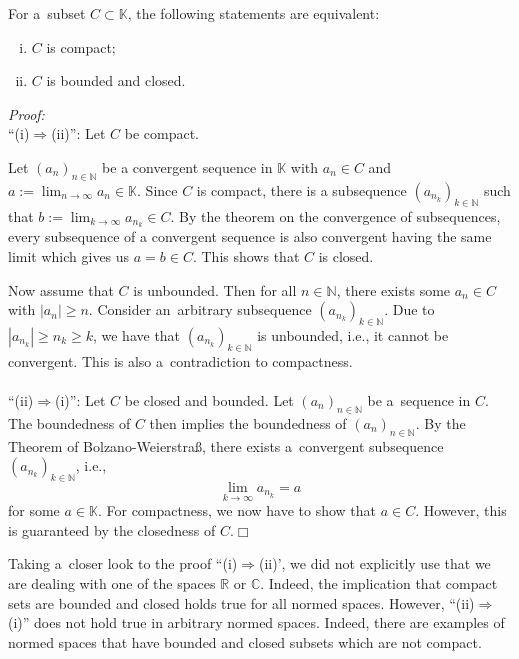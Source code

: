 

\begin{Theorem}
For a~subset $C\subset\mathbb{K}$, the following statements are equivalent:
\begin{enumerate}[(i)]
 \item $C$ is compact;
 \item $C$ is bounded and closed.
\end{enumerate}
\end{Theorem}
{\em Proof:} \\
``(i)$\Rightarrow$(ii)'': Let $C$ be compact. 

Let $(a_n)_{n\in\mathbb{N}}$ be a convergent sequence in $\mathbb{K}$ with $a_n\in C$ and $a:=\lim_{n\rightarrow\infty} a_n \in\mathbb{K}$. 
Since $C$ is compact, there is a subsequence $(a_{n_k})_{k\in\mathbb{N}}$ such that $b:=\lim_{k\rightarrow\infty} a_{n_k}\in C$.
By the theorem on the convergence of subsequences, every subsequence of a convergent sequence is also convergent having the same limit which gives us $a=b\in C$. This shows that $C$ is closed.

Now assume that $C$ is unbounded. Then for all $n\in\mathbb{N}$, there exists some $a_n\in C$ with $|a_n|\geq n$. Consider an~arbitrary subsequence $(a_{n_k})_{k\in\mathbb{N}}$. Due to $|a_{n_k}|\geq n_k\geq k$, we have that $(a_{n_k})_{k\in\mathbb{N}}$ is unbounded, i.e., it cannot be convergent. This is also a~contradiction to compactness.\\
~\\
``(ii)$\Rightarrow$(i)'':
Let $C$ be closed and bounded. Let  $(a_n)_{n\in\mathbb{N}}$ be a~sequence in $C$. The boundedness of $C$ then implies the boundedness of $(a_n)_{n\in\mathbb{N}}$. By the Theorem of Bolzano-Weierstra\ss, there exists a~convergent subsequence  $(a_{n_k})_{k\in\mathbb{N}}$, i.e.,
\[\lim_{k\to\infty}a_{n_k}=a\]
for some $a\in\mathbb{K}$. For compactness, we now have to show that $a\in C$. However, this is guaranteed by the closedness of $C$.\hfill$\Box$
\begin{Remark}{}
    Taking a~closer look to the proof ``(i)$\Rightarrow$(ii)', we did not explicitly use that we are dealing with one of the spaces $\mathbb{R}$ or $\mathbb{C}$. Indeed, the implication that compact sets are bounded and closed holds true for all normed spaces. However, ``(ii)$\Rightarrow$(i)'' does not hold true in arbitrary normed spaces. Indeed, there are examples of normed spaces that have bounded and closed subsets which are not compact.
\end{Remark}
